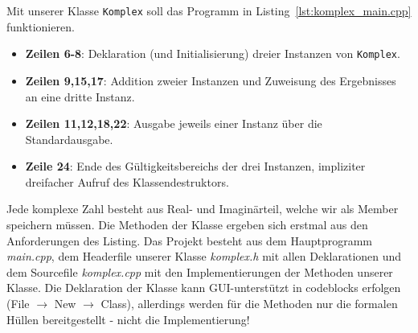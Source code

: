 %
Mit unserer Klasse \texttt{Komplex} soll das Programm in Listing~\ref{lst:komplex_main.cpp} funktionieren.
\begin{itemize}
    \item \textbf{Zeilen 6-8}: Deklaration (und Initialisierung) dreier Instanzen von \texttt{Komplex}.
    \item \textbf{Zeilen 9,15,17}: Addition zweier Instanzen und Zuweisung des Ergebnisses an eine dritte Instanz.
    \item \textbf{Zeilen 11,12,18,22}: Ausgabe jeweils einer Instanz über die Standardausgabe.
    \item \textbf{Zeile 24}: Ende des Gültigkeitsbereichs der drei Instanzen,
    impliziter dreifacher Aufruf des Klassendestruktors.
\end{itemize}
Jede komplexe Zahl besteht aus Real- und Imaginärteil, welche wir als Member speichern müssen.
Die Methoden der Klasse ergeben sich erstmal aus den Anforderungen des Listing.
Das Projekt besteht aus dem Hauptprogramm \emph{main.cpp}, dem Headerfile unserer Klasse
\emph{komplex.h} mit allen Deklarationen und dem Sourcefile \emph{komplex.cpp} mit den
Implementierungen der Methoden unserer Klasse.
Die Deklaration der Klasse kann GUI-unterstützt in codeblocks erfolgen
(File $\rightarrow$ New $\rightarrow$ Class), allerdings werden für die Methoden nur die
formalen Hüllen bereitgestellt - nicht die Implementierung!

